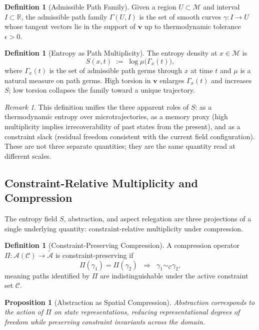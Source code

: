 \documentclass[11pt]{article}
\theoremstyle{plain}
\newtheorem{proposition}[theorem]{Proposition}
\theoremstyle{definition}
\newtheorem{definition}[theorem]{Definition}
\theoremstyle{remark}
\newtheorem{remark}[theorem]{Remark}
\newcommand{\vv}{\mathbf{v}}
\newcommand{\Ss}{S}
\newcommand{\M}{\mathcal{M}}
\begin{document}
\begin{definition}[Admissible Path Family]
Given a region $U \subset \M$ and interval $I \subset \mathbb{R}$, the
admissible path family $\Gamma(U,I)$ is the set of smooth curves
$\gamma : I \to U$ whose tangent vectors lie in the support of $\vv$ up
to thermodynamic tolerance $\epsilon > 0$.
\end{definition}

\begin{definition}[Entropy as Path Multiplicity]
The entropy density at $x \in \M$ is
\[
  \Ss(x,t) \;:=\; \log \mu\bigl(\Gamma_x(t)\bigr),
\]
where $\Gamma_x(t)$ is the set of admissible path germs through $x$ at
time $t$ and $\mu$ is a natural measure on path germs. High torsion in
$\vv$ enlarges $\Gamma_x(t)$ and increases $\Ss$; low torsion collapses
the family toward a unique trajectory.
\end{definition}

\begin{remark}
This definition unifies the three apparent roles of $\Ss$: as a
thermodynamic entropy over microtrajectories, as a memory proxy
(high multiplicity implies irrecoverability of past states from the
present), and as a constraint slack (residual freedom consistent with
the current field configuration). These are not three separate
quantities; they are the same quantity read at different scales.
\end{remark}

\subsection{Constraint-Relative Multiplicity and Compression}

The entropy field $\Ss$, abstraction, and aspect relegation are three
projections of a single underlying quantity: constraint-relative
multiplicity under compression.

\begin{definition}[Constraint-Preserving Compression]
A compression operator $\Pi : \mathcal{A}(\mathcal{C}) \to
\tilde{\mathcal{A}}$ is constraint-preserving if
\[
  \Pi(\gamma_1) = \Pi(\gamma_2)
  \;\;\Rightarrow\;\;
  \gamma_1 \sim_{\mathcal{C}} \gamma_2,
\]
meaning paths identified by $\Pi$ are indistinguishable under the
active constraint set $\mathcal{C}$.
\end{definition}

\begin{proposition}[Abstraction as Spatial Compression]
Abstraction corresponds to the action of $\Pi$ on state representations,
reducing representational degrees of freedom while preserving constraint
invariants across the domain.
\end{proposition}
\end{document}
